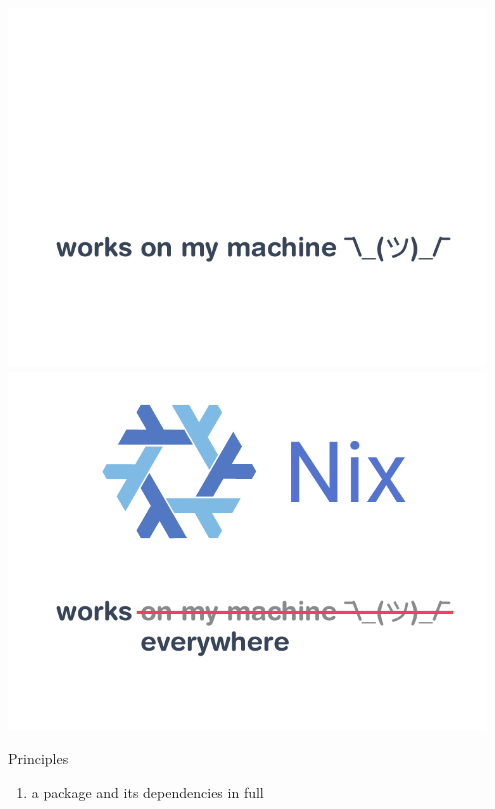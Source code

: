 \documentclass[a4paper]{beamer}
\newcommand{\couleur}[2]{{\color{#1}{#2}}}
\begin{document}
\begin{frame}
     {
        \includegraphics[width=0.95\textwidth]{img/schema-nix-motto-pre.pdf}
    }
     {
        \includegraphics[width=0.95\textwidth]{img/schema-nix-motto.pdf}
    }
\end{frame}

\begin{frame}
    \begin{block}{Principles}
        \begin{enumerate}
            \item<2-> \couleur{blue-portage}{Describe} a package and its
                dependencies in full
         \end{enumerate}
    \end{block}
\end{frame}
\end{document}
